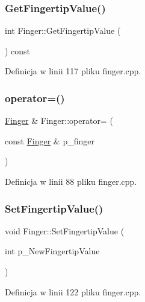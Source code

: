\subsubsection{\texorpdfstring{Get\+Fingertip\+Value()}{GetFingertipValue()}}
{\footnotesize\ttfamily int Finger\+::\+Get\+Fingertip\+Value (\begin{DoxyParamCaption}{ }\end{DoxyParamCaption}) const}



Definicja w linii 117 pliku finger.\+cpp.

\mbox{\label{class_finger_a09ecbb5c21531a771b9524dfcd49b6a6}} 
\subsubsection{\texorpdfstring{operator=()}{operator=()}}
{\footnotesize\ttfamily \hyperlink{class_finger}{Finger} \& Finger\+::operator= (\begin{DoxyParamCaption}\item[{const \hyperlink{class_finger}{Finger} \&}]{p\+\_\+finger }\end{DoxyParamCaption})}



Definicja w linii 88 pliku finger.\+cpp.

\mbox{\label{class_finger_acb60693c51df450dc51796ec235894f9}} 
\subsubsection{\texorpdfstring{Set\+Fingertip\+Value()}{SetFingertipValue()}}
{\footnotesize\ttfamily void Finger\+::\+Set\+Fingertip\+Value (\begin{DoxyParamCaption}\item[{int}]{p\+\_\+\+New\+Fingertip\+Value }\end{DoxyParamCaption})}



Definicja w linii 122 pliku finger.\+cpp.

\mbox{\label{class_finger_a95a2e12235a97dec295aeb92c749ec06}} 
